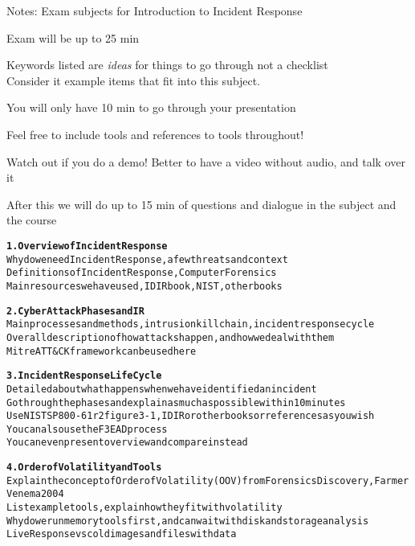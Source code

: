 \documentclass[Screen16to9,17pt]{foils}
\begin{document}
Notes: Exam subjects for Introduction to Incident Response
\begin{list2}
\item Exam will be up to 25 min
\item Keywords listed are \emph{ideas} for things to go through not a checklist\\
Consider it example items that fit into this subject.
\item You will only have 10 min to go through your presentation
\item Feel free to include tools and references to tools throughout!
\item Watch out if you do a demo! Better to have a video without audio, and talk over it
\item After this we will do up to 15 min of questions and dialogue in the subject and the course
\end{list2}



\begin{alltt}
{\bf 1. Overview of Incident Response}\\
Why do we need Incident Response, a few threats and context
Definitions of Incident Response, Computer Forensics
Main resources we have used, IDIR book, NIST, other books

{\bf 2. Cyber Attack Phases and IR}\\
Main processes and methods, intrusion kill chain, incident response cycle
Overall description of how attacks happen, and how we deal with them
Mitre ATT&CK framework can be used here
\end{alltt}



\begin{alltt}
{\bf 3. Incident Response Life Cycle}\\
Detailed about what happens when we have identified an incident
Go through the phases and explain as much as possible within 10minutes
Use NIST SP800-61r2 figure 3-1, IDIR or other books or references as you wish
You can also use the F3EAD process
You can even present overview and compare instead

{\bf 4. Order of Volatility and Tools}\\
Explain the concept of Order of Volatility (OOV) from Forensics Discovery, Farmer Venema 2004
List example tools, explain how they fit with volatility
Why do we run memory tools first, and can wait with disk and storage analysis
Live Response vs cold images and files with data
\end{alltt}
\end{document}
